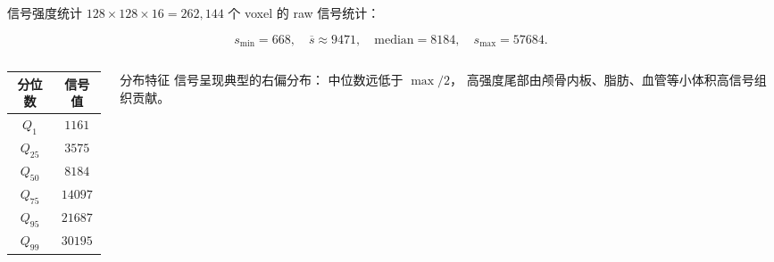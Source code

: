 \documentclass[aspectratio=169,11pt]{ctexbeamer}
\begin{document}
\begin{frame}{信号强度统计}
  \small
  $128\times 128\times 16 = 262{,}144$ 个 voxel 的 raw 信号统计：

  \[
    s_{\min}=668,\quad
    \overline s\approx 9471,\quad
    \mathrm{median}=8184,\quad
    s_{\max}=57684 .
  \]

  \begin{columns}
    \begin{column}{0.48\linewidth}
      \begin{tabular}{cc}
        \toprule
        分位数 & 信号值 \\
        \midrule
        $Q_{1}$ & $1161$\\
        $Q_{25}$ & $3575$\\
        $Q_{50}$ & $8184$\\
        $Q_{75}$ & $14097$\\
        $Q_{95}$ & $21687$\\
        $Q_{99}$ & $30195$\\
        \bottomrule
      \end{tabular}
    \end{column}
    \begin{column}{0.48\linewidth}
      \begin{block}{分布特征}
        信号呈现典型的右偏分布：
        中位数远低于 $\max/2$，
        高强度尾部由颅骨内板、脂肪、血管等小体积高信号组织贡献。
      \end{block}
    \end{column}
  \end{columns}
\end{frame}
\end{document}
